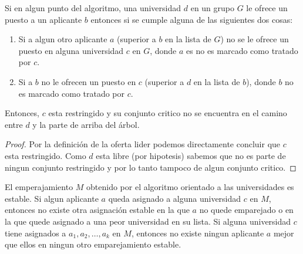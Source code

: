 \begin{lem}
Si en algun punto del algoritmo, una universidad $d$ en un grupo $G$ le ofrece un puesto a un aplicante $b$ entonces si se cumple alguna de las siguientes dos cosas:
\begin{enumerate}
\item Si a algun otro aplicante $a$ (superior a $b$ en la lista de $G$) no se le ofrece un puesto en alguna universidad $c$ en $G$, donde $a$ es no es marcado como tratado por $c$.
\item Si a $b$ no le ofrecen un puesto en $c$ (superior a $d$ en la lista de $b$), donde $b$ no es marcado como tratado por $c$.
\end{enumerate}
Entonces, $c$ esta restringido y su conjunto critico no se encuentra en el camino entre $d$ y la parte de arriba del árbol.
\end{lem}
\begin{proof}
Por la definición de la oferta lider podemos directamente concluir que $c$ esta restringido. Como $d$ esta libre (por hipotesis) sabemos que no es parte de ningun conjunto restringido y por lo tanto tampoco de algun conjunto critico.
\end{proof}
\begin{teo}
El emperajamiento $M$ obtenido por el algoritmo orientado a las universidades es estable. Si algun aplicante $a$ queda asignado a alguna universidad $c$ en $M$, entonces no existe otra asignación estable en la que $a$ no quede emparejado o en la que quede asignado a una peor universidad en su lista. Si alguna universidad $c$ tiene asignados a $a_1,a_2,\dots,a_k$ en $M$, entonces no existe ningun aplicante $a$ mejor  que ellos en ningun otro emparejamiento estable.
\end{teo}
